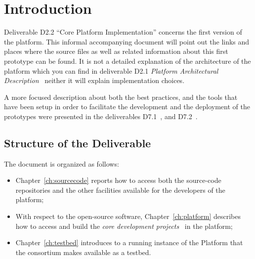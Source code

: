 \documentclass{learnpad}
\begin{document}


\mainmatter


\chapter{Introduction}
\label{ch:intro}

Deliverable D2.2 ``Core Platform Implementation'' concerns the first version of the \learnpad platform.
This informal accompanying document will point out the links and places where the source files as well as related
information about this first prototype can be found.  It is not a detailed explanation of the
architecture of the platform which you can find in deliverable D2.1
\emph{Platform Architectural Description}~\cite{learnpad:D2.1} neither it will 
explain implementation choices.

A more focused description about both the best practices, and the tools 
that have been setup in order to facilitate the development and the deployment 
of the \learnpad prototypes were presented in the deliverables 
D7.1~\cite{learnpad:D7.1}, and D7.2~\cite{learnpad:D7.2}.

\section{Structure of the Deliverable}
\label{sec:structure}

The document is organized as follows:
\begin{itemize}
 \item Chapter~\ref{ch:sourcecode} reports how to access both the 
source-code repositories and the other facilities available for the developers 
of the \learnpad platform;
 \item With respect to the open-source software, Chapter~\ref{ch:platform} 
describes how to access and build the \textit{core development 
projects}~\cite{learnpad:D7.1} in the platform;
 \item Chapter~\ref{ch:testbed} introduces to a running instance of the 
\learnpad Platform that the consortium makes available as a testbed.
\end{itemize}
\end{document}
